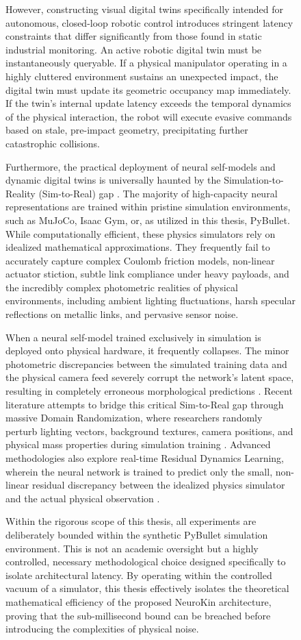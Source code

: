 \documentclass[12pt,a4paper,oneside]{report}
\begin{document}
\begin{figure}[H]
However, constructing visual digital twins specifically intended for autonomous, closed-loop robotic control introduces stringent latency constraints that differ significantly from those found in static industrial monitoring. An active robotic digital twin must be instantaneously queryable. If a physical manipulator operating in a highly cluttered environment sustains an unexpected impact, the digital twin must update its geometric occupancy map immediately. If the twin's internal update latency exceeds the temporal dynamics of the physical interaction, the robot will execute evasive commands based on stale, pre-impact geometry, precipitating further catastrophic collisions.

Furthermore, the practical deployment of neural self-models and dynamic digital twins is universally haunted by the Simulation-to-Reality (Sim-to-Real) gap \cite{tan2018simtoreal, aljalbout2026realitygap}. The majority of high-capacity neural representations are trained within pristine simulation environments, such as MuJoCo, Isaac Gym, or, as utilized in this thesis, PyBullet. While computationally efficient, these physics simulators rely on idealized mathematical approximations. They frequently fail to accurately capture complex Coulomb friction models, non-linear actuator stiction, subtle link compliance under heavy payloads, and the incredibly complex photometric realities of physical environments, including ambient lighting fluctuations, harsh specular reflections on metallic links, and pervasive sensor noise.

When a neural self-model trained exclusively in simulation is deployed onto physical hardware, it frequently collapses. The minor photometric discrepancies between the simulated training data and the physical camera feed severely corrupt the network's latent space, resulting in completely erroneous morphological predictions \cite{rezvani2024robust}. Recent literature attempts to bridge this critical Sim-to-Real gap through massive Domain Randomization, where researchers randomly perturb lighting vectors, background textures, camera positions, and physical mass properties during simulation training \cite{tan2018simtoreal}. Advanced methodologies also explore real-time Residual Dynamics Learning, wherein the neural network is trained to predict only the small, non-linear residual discrepancy between the idealized physics simulator and the actual physical observation \cite{qiu2024swim2real, lim2025splat2real}.

Within the rigorous scope of this thesis, all experiments are deliberately bounded within the synthetic PyBullet simulation environment. This is not an academic oversight but a highly controlled, necessary methodological choice designed specifically to isolate architectural latency. By operating within the controlled vacuum of a simulator, this thesis effectively isolates the theoretical mathematical efficiency of the proposed NeuroKin architecture, proving that the sub-millisecond bound can be breached before introducing the complexities of physical noise.


\end{figure}
\end{document}
